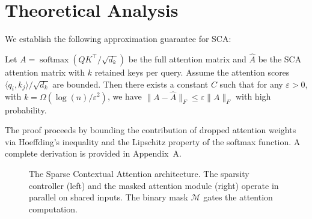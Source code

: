 \section{Theoretical Analysis}

We establish the following approximation guarantee for SCA:

\begin{theorem}\label{thm:sca-bound}
  Let $A = \operatorname{softmax}(QK^{\top}/\sqrt{d_k})$ be the full attention matrix
  and $\hat{A}$ be the SCA attention matrix with $k$ retained keys per query. Assume
  the attention scores $\langle q_i, k_j \rangle / \sqrt{d_k}$ are bounded. Then there
  exists a constant $C$ such that for any $\varepsilon > 0$, with
  $k = \Omega(\log(n)/\varepsilon^2)$, we have
  $\|A - \hat{A}\|_F \leq \varepsilon \|A\|_F$ with high probability.
\end{theorem}

The proof proceeds by bounding the contribution of dropped attention weights via
Hoeffding's inequality and the Lipschitz property of the softmax function. A complete
derivation is provided in Appendix~A.

\begin{figure}[htbp]
  \centering
  \caption{The Sparse Contextual Attention architecture. The sparsity controller
    (left) and the masked attention module (right) operate in parallel on shared
    inputs. The binary mask $\mathcal{M}$ gates the attention computation.}
  \label{fig:sca-architecture}
\end{figure}

